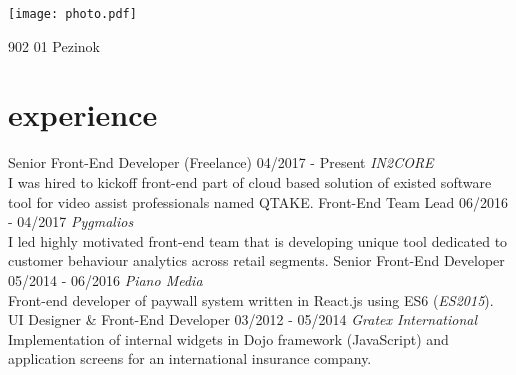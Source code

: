 \documentclass[a4paper]{cv}
\begin{document}


\begin{aside}
	\texttt{[image: photo.pdf]}
	\address{Banícka 21}{902 01 Pezinok}
	\section{\vspace{5mm}         }
\end{aside}

\section{experience}
\begin{entrylist}
	\entry
		{Senior Front-End Developer (Freelance)}
		{04/2017 - Present}
		{\emph{IN2CORE}\\
		I was hired to kickoff front-end part of cloud based solution of existed software tool for video assist professionals named QTAKE.}
	\entry
		{Front-End Team Lead}
		{06/2016 - 04/2017}
		{\emph{Pygmalios}\\
		I led highly motivated front-end team that is developing unique tool dedicated to customer behaviour analytics across retail segments.}
	\entry
		{Senior Front-End Developer}
		{05/2014 - 06/2016}
		{\emph{Piano Media}\\
		Front-end developer of paywall system written in React.js using ES6 ({\emph{ES2015}}).}
	\entry
		{UI Designer \& Front-End Developer}
		{03/2012 - 05/2014}
		{\emph{Gratex International}\\
		Implementation of internal widgets in Dojo framework (JavaScript) and application screens for an international insurance company.}
\end{entrylist}
\end{document}
